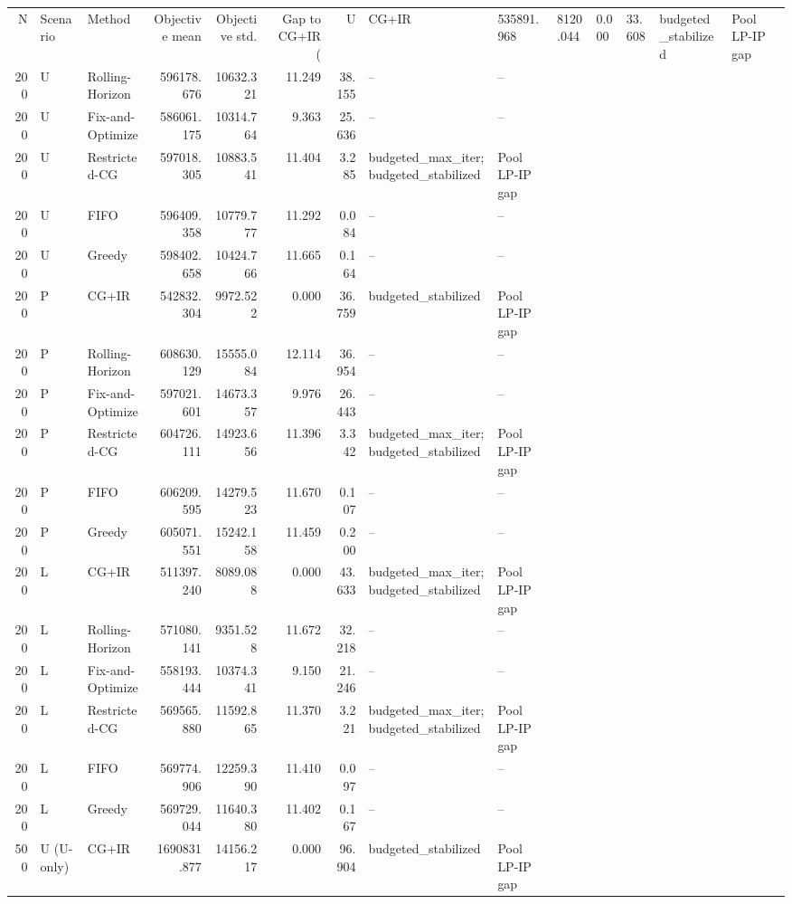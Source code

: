 \begin{tabular}{rllrrrrll}
\toprule
N & Scenario & Method & Objective mean & Objective std. & Gap to CG+IR (%
 & U & CG+IR & 535891.968 & 8120.044 & 0.000 & 33.608 & budgeted_stabilized & Pool LP-IP gap \\
200 & U & Rolling-Horizon & 596178.676 & 10632.321 & 11.249 & 38.155 & -- & -- \\
200 & U & Fix-and-Optimize & 586061.175 & 10314.764 & 9.363 & 25.636 & -- & -- \\
200 & U & Restricted-CG & 597018.305 & 10883.541 & 11.404 & 3.285 & budgeted_max_iter;budgeted_stabilized & Pool LP-IP gap \\
200 & U & FIFO & 596409.358 & 10779.777 & 11.292 & 0.084 & -- & -- \\
200 & U & Greedy & 598402.658 & 10424.766 & 11.665 & 0.164 & -- & -- \\
200 & P & CG+IR & 542832.304 & 9972.522 & 0.000 & 36.759 & budgeted_stabilized & Pool LP-IP gap \\
200 & P & Rolling-Horizon & 608630.129 & 15555.084 & 12.114 & 36.954 & -- & -- \\
200 & P & Fix-and-Optimize & 597021.601 & 14673.357 & 9.976 & 26.443 & -- & -- \\
200 & P & Restricted-CG & 604726.111 & 14923.656 & 11.396 & 3.342 & budgeted_max_iter;budgeted_stabilized & Pool LP-IP gap \\
200 & P & FIFO & 606209.595 & 14279.523 & 11.670 & 0.107 & -- & -- \\
200 & P & Greedy & 605071.551 & 15242.158 & 11.459 & 0.200 & -- & -- \\
200 & L & CG+IR & 511397.240 & 8089.088 & 0.000 & 43.633 & budgeted_max_iter;budgeted_stabilized & Pool LP-IP gap \\
200 & L & Rolling-Horizon & 571080.141 & 9351.528 & 11.672 & 32.218 & -- & -- \\
200 & L & Fix-and-Optimize & 558193.444 & 10374.341 & 9.150 & 21.246 & -- & -- \\
200 & L & Restricted-CG & 569565.880 & 11592.865 & 11.370 & 3.221 & budgeted_max_iter;budgeted_stabilized & Pool LP-IP gap \\
200 & L & FIFO & 569774.906 & 12259.390 & 11.410 & 0.097 & -- & -- \\
200 & L & Greedy & 569729.044 & 11640.380 & 11.402 & 0.167 & -- & -- \\
500 & U (U-only) & CG+IR & 1690831.877 & 14156.217 & 0.000 & 96.904 & budgeted_stabilized & Pool LP-IP gap \\

\end{tabular}
